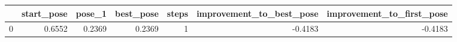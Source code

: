 \begin{tabular}{lrrrrrr}
\toprule
{} &  start\_pose &  pose\_1 &  best\_pose &  steps &  improvement\_to\_best\_pose &  improvement\_to\_first\_pose \\
\midrule
0 &      0.6552 &  0.2369 &     0.2369 &      1 &                   -0.4183 &                    -0.4183 \\
\bottomrule
\end{tabular}
